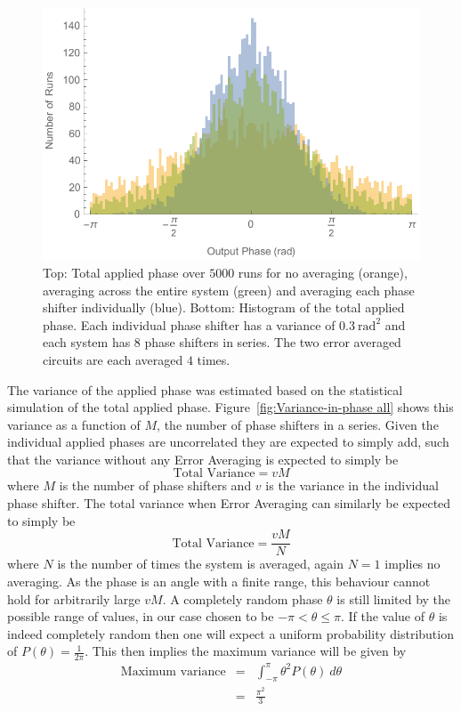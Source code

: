 \documentclass[aps,pra,twocolumn,superscriptaddress,numerical,floatfix]{revtex4-1}
\begin{document}
%
\begin{figure}
\centerline{\includegraphics[width=\columnwidth]{totphase2.pdf}}
\caption{Top: Total applied phase over $5000$ runs for no averaging (orange), averaging across the entire system (green) and averaging each phase shifter individually (blue). Bottom: Histogram of the total applied phase. Each individual phase shifter has a variance of $0.3\ \textrm{rad}^{2}$ and each system has $8$ phase shifters in series. The two error averaged circuits are each averaged $4$ times. \label{fig:Total-applied-phase2}}
\end{figure}

The variance of the applied phase was estimated based on the statistical simulation of the total applied phase. Figure~\ref{fig:Variance-in-phase all} shows this variance as a function of $M$, the number of phase shifters in a series. Given the individual applied phases are uncorrelated they are expected to simply add, such that the variance without any Error Averaging is expected to simply be
\begin{equation}
\textrm{Total Variance}=vM\label{eq:Tot Var no correction}
\end{equation}
where $M$ is the number of phase shifters and $v$ is the variance in the individual phase shifter. The total variance when Error Averaging can similarly be expected to simply be
\begin{equation}
\textrm{Total Variance}=\frac{vM}{N}\label{eq:Tot Var w/ correction}
\end{equation}
where $N$ is the number of times the system is averaged, again $N=1$ implies no averaging. As the phase is an angle with a finite range, this behaviour cannot hold for arbitrarily large $vM$. A completely random phase $\theta$ is still limited by the possible range of values, in our case chosen to be $-\pi<\theta\le\pi$. If the value of $\theta$ is indeed completely random then one will expect a uniform probability distribution of $P\left(\theta\right)=\frac{1}{2\pi}$. This then implies the maximum variance will be given by
\begin{eqnarray}
\textrm{Maximum variance} & = & \int_{-\pi}^{\pi}\theta^{2}P\left(\theta\right)\ d\theta\nonumber \\
& = & \frac{\pi^{2}}{3}\label{eq:Max Var}
\end{eqnarray}
\end{document}
